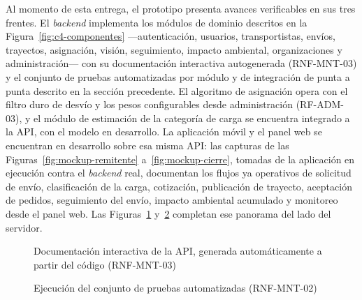 {Al momento de esta entrega, el prototipo presenta avances verificables en sus tres frentes. El \emph{backend} implementa los módulos de dominio descritos en la Figura~\ref{fig:c4-componentes} —autenticación, usuarios, transportistas, envíos, trayectos, asignación, visión, seguimiento, impacto ambiental, organizaciones y administración— con su documentación interactiva autogenerada (RNF-MNT-03) y el conjunto de pruebas automatizadas por módulo y de integración de punta a punta descrito en la sección precedente. El algoritmo de asignación opera con el filtro duro de desvío y los pesos configurables desde administración (RF-ADM-03), y el módulo de estimación de la categoría de carga se encuentra integrado a la API, con el modelo en desarrollo. La aplicación móvil y el panel web se encuentran en desarrollo sobre esa misma API: las capturas de las Figuras~\ref{fig:mockup-remitente} a~\ref{fig:mockup-cierre}, tomadas de la aplicación en ejecución contra el \emph{backend} real, documentan los flujos ya operativos de solicitud de envío, clasificación de la carga, cotización, publicación de trayecto, aceptación de pedidos, seguimiento del envío, impacto ambiental acumulado y monitoreo desde el panel web. Las Figuras~\ref{fig:demo-api} y~\ref{fig:demo-tests} completan ese panorama del lado del servidor.

\begin{figure}[H]
    \centering\color{nuevo}
    \caption{Documentación interactiva de la API, generada automáticamente a partir del código (RNF-MNT-03)}
    \label{fig:demo-api}
\end{figure}

\begin{figure}[H]
    \centering\color{nuevo}
    \caption{Ejecución del conjunto de pruebas automatizadas (RNF-MNT-02)}
    \label{fig:demo-tests}
\end{figure}
}%
